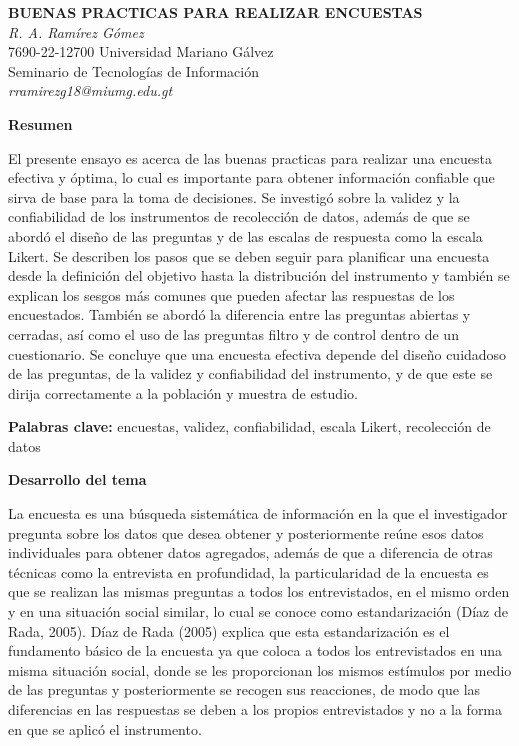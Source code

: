 \documentclass[12pt,letterpaper]{article}
\newcommand{\subtitulo}[1]{\noindent\textbf{#1}\par\vspace{2pt}}
\begin{document}
\begin{center}
\textbf{BUENAS PRACTICAS PARA REALIZAR ENCUESTAS}\\[8pt]
\textit{R. A. Ramírez Gómez}\\
7690-22-12700 Universidad Mariano Gálvez\\
Seminario de Tecnologías de Información\\
\textit{rramirezg18@miumg.edu.gt}
\end{center}

\vspace{10pt}


\subtitulo{Resumen}
El presente ensayo es acerca de las buenas practicas para realizar una encuesta efectiva y óptima, lo cual es importante para obtener información confiable que sirva de base para la toma de decisiones. Se investigó sobre la validez y la confiabilidad de los instrumentos de recolección de datos, además de que se abordó el diseño de las preguntas y de las escalas de respuesta como la escala Likert. Se describen los pasos que se deben seguir para planificar una encuesta desde la definición del objetivo hasta la distribución del instrumento y también se explican los sesgos más comunes que pueden afectar las respuestas de los encuestados. También se abordó la diferencia entre las preguntas abiertas y cerradas, así como el uso de las preguntas filtro y de control dentro de un cuestionario. Se concluye que una encuesta efectiva depende del diseño cuidadoso de las preguntas, de la validez y confiabilidad del instrumento, y de que este se dirija correctamente a la población y muestra de estudio.

\noindent\textbf{Palabras clave:} encuestas, validez, confiabilidad, escala Likert, recolección de datos

\vspace{6pt}

\subtitulo{Desarrollo del tema}

La encuesta es una búsqueda sistemática de información en la que el investigador pregunta sobre los datos que desea obtener y posteriormente reúne esos datos individuales para obtener datos agregados, además de que a diferencia de otras técnicas como la entrevista en profundidad, la particularidad de la encuesta es que se realizan las mismas preguntas a todos los entrevistados, en el mismo orden y en una situación social similar, lo cual se conoce como estandarización (Díaz de Rada, 2005). Díaz de Rada (2005) explica que esta estandarización es el fundamento básico de la encuesta ya que coloca a todos los entrevistados en una misma situación social, donde se les proporcionan los mismos estímulos por medio de las preguntas y posteriormente se recogen sus reacciones, de modo que las diferencias en las respuestas se deben a los propios entrevistados y no a la forma en que se aplicó el instrumento.
\end{document}
